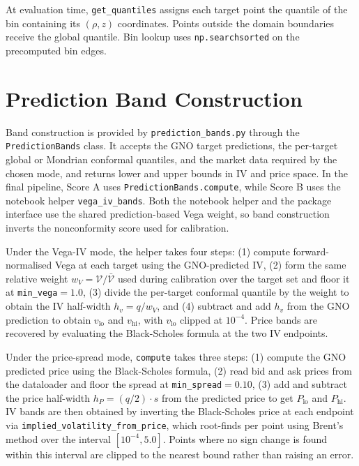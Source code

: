 At evaluation time, \texttt{get\_quantiles} assigns each target point the quantile of the bin containing its $(\rho,z)$ coordinates. Points outside the domain boundaries receive the global quantile. Bin lookup uses \texttt{np.searchsorted} on the precomputed bin edges.

\section{Prediction Band Construction}
\label{sec:impl_bands}

Band construction is provided by \texttt{prediction\_bands.py} through the \texttt{PredictionBands} class. It accepts the GNO target predictions, the per-target global or Mondrian conformal quantiles, and the market data required by the chosen mode, and returns lower and upper bounds in IV and price space. In the final pipeline, Score A uses \texttt{PredictionBands.compute}, while Score B uses the notebook helper \texttt{vega\_iv\_bands}. Both the notebook helper and the package interface use the shared prediction-based Vega weight, so band construction inverts the nonconformity score used for calibration.

Under the Vega-IV mode, the helper takes four steps: (1) compute forward-normalised Vega at each target using the GNO-predicted IV, (2) form the same relative weight $w_V = \mathcal{V}/\bar{\mathcal{V}}$ used during calibration over the target set and floor it at \texttt{min\_vega}$=1.0$, (3) divide the per-target conformal quantile by the weight to obtain the IV half-width $h_v = q/w_V$, and (4) subtract and add $h_v$ from the GNO prediction to obtain $v_{\text{lo}}$ and $v_{\text{hi}}$, with $v_{\text{lo}}$ clipped at $10^{-4}$. Price bands are recovered by evaluating the Black-Scholes formula at the two IV endpoints.

Under the price-spread mode, \texttt{compute} takes three steps: (1) compute the GNO predicted price using the Black-Scholes formula, (2) read bid and ask prices from the dataloader and floor the spread at \texttt{min\_spread}$= 0.10$, (3) add and subtract the price half-width $h_P = (q/2) \cdot s$ from the predicted price to get $P_{\text{lo}}$ and $P_{\text{hi}}$. IV bands are then obtained by inverting the Black-Scholes price at each endpoint via \texttt{implied\_volatility\_from\_price}, which root-finds per point using Brent's method over the interval $[10^{-4}, 5.0]$. Points where no sign change is found within this interval are clipped to the nearest bound rather than raising an error.

